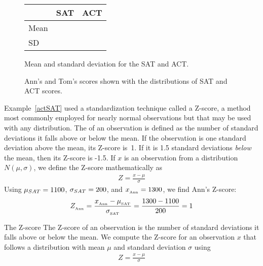 \begin{figure}[h]
\centering
\begin{tabular}{l r r}
  \hline
  & SAT & ACT \\
  \hline
  Mean \hspace{0.3cm} & \satmean{} & \actmean{} \\
  SD & \satsd{} & \actsd{} \\
  \hline
\end{tabular}
\caption{Mean and standard deviation for the SAT and ACT.}
\label{satACTstats}
\end{figure}

\begin{figure}
  \centering
  \caption{Ann's and Tom's scores shown with the distributions
      of SAT and ACT scores.}
  \label{satActNormals}
\end{figure}

Example~\ref{actSAT} used a standardization technique called
a Z-score, a method most commonly employed for nearly normal
observations but that may be used with any distribution.
The  of an observation is defined
as the number of standard deviations it falls above or below
the mean.
If the observation is one standard deviation above the mean,
its Z-score is~1.
If it is 1.5 standard deviations \emph{below} the mean,
then its Z-score is -1.5.
If $x$ is an observation from a distribution $N(\mu, \sigma)$,
we define the Z-score mathematically as
\begin{align*}
Z = \frac{x - \mu}{\sigma}
\end{align*}
Using $\mu_{SAT} = 1100{}$, $\sigma_{SAT} = 200{}$,
and $x_{_{\text{Ann}}} = 1300{}$, we find Ann's Z-score:
\begin{align*}
Z_{_{\text{Ann}}}
  = \frac{x_{_{\text{Ann}}} - \mu_{_{\text{SAT}}}}
      {\sigma_{_{\text{SAT}}}}
  = \frac{1300{} - 1100{}}{200{}}
  = 1{}
\end{align*}

\begin{onebox}{The Z-score}
  The Z-score of an observation is the number of standard
  deviations it falls above or below the mean.
  We compute the Z-score for an observation $x$ that follows
  a distribution with mean $\mu$ and standard deviation
  $\sigma$ using
  \begin{align*}
  Z = \frac{x - \mu}{\sigma}
  \end{align*}
\end{onebox}

